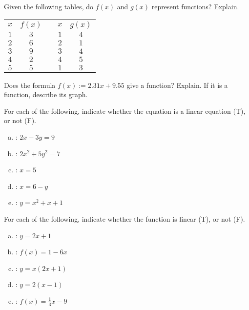 \documentclass[11pt,letterpaper]{article}
\begin{document}
 Given the following tables, do $f(x)$ and $g(x)$ represent functions? Explain. 
	\begin{table}[!ht]
	\centering \setlength\arrayrulewidth{0.02cm}
	\begin{tabular}{c|ccc|c} 
	$x$ & $f(x)$ & \hspace{2cm} & $x$ & $g(x)$ \\ \cline{1-2} \cline{4-5}
	$1$ & $3$ && $1$ & $4$ \\
	$2$ & $6$ && $2$ & $1$ \\
	$3$ & $9$ && $3$ & $4$ \\
	$4$ & $2$ && $4$ & $5$ \\
	$5$ & $5$ && $1$ & $3$  
	\end{tabular}
	\end{table}
	


\vfill
\newpage



 Does the formula $f(x):= 2.31x + 9.55$ give a function? Explain. If it is a function, describe its graph. 




\vfill 



 For each of the following, indicate whether the equation is a linear equation (T), or not (F). 
	\begin{enumerate}[(a)]
	\item \uans{1.6cm}: $2x - 3y= 9$
	\item \uans{1.6cm}: $2x^2 + 5y^2= 7$
	\item \uans{1.6cm}: $x= 5$
	\item \uans{1.6cm}: $x= 6- y$
	\item \uans{1.6cm}: $y= x^2 + x + 1$
	\end{enumerate}



\vfill



 For each of the following, indicate whether the function is linear (T), or not (F). 
	\begin{enumerate}[(a)]
	\item \uans{1.6cm}: $y= 2x + 1$
	\item \uans{1.6cm}: $f(x)= 1 - 6x$
	\item \uans{1.6cm}: $y= x ( 2x + 1)$
	\item \uans{1.6cm}: $y= 2(x - 1)$
	\item \uans{1.6cm}: $f(x)= \frac{1}{3}x - 9$
	\end{enumerate}
\end{document}
